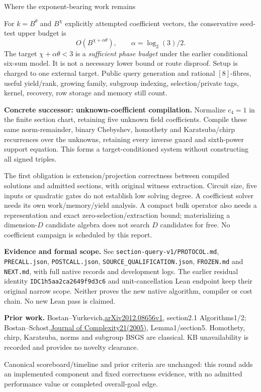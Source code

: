 \documentclass[10pt]{article}
\begin{document}
\newpage
{\large Where the exponent-bearing work remains}\par
For $k=B^\theta$ and $B^\chi$ explicitly attempted coefficient vectors,
the conservative seed-test upper budget is
\[
O(B^{\chi+\alpha\theta}),\qquad\alpha=\log_2(3)/2.
\]
The target $\chi+\alpha\theta<3$ is a \emph{sufficient phase budget} under the
earlier conditional six-sum model. It is not a necessary lower bound or route
disproof. Setup is charged to one external target. Public query generation and
rational $[8]$-fibres, useful yield/rank, growing family, subgroup indexing,
selection/private tags, kernel, recovery, row storage and memory still count.

\textbf{Concrete successor: unknown-coefficient compilation.}
Normalize $c_4=1$ in the finite section chart, retaining five unknown field
coefficients. Compile these same norm-remainder, binary Chebyshev,
homothety and Karatsuba/chirp recurrences over the unknowns, retaining every
inverse guard and sixth-power support equation. This forms a target-conditioned
system without constructing all signed triples.

The first obligation is extension/projection correctness between compiled
solutions and admitted sections, with original witness extraction. Circuit
size, five inputs or quadratic gates do not establish low solving degree.
A coefficient solver needs its own work/memory/yield analysis. A compact bulk
operator also needs a representation and exact zero-selection/extraction bound;
materializing a dimension-$D$ candidate algebra does not search $D$ candidates
for free. No coefficient campaign is scheduled by this report.

\textbf{Evidence and formal scope.}
See \texttt{section-query-v1/PROTOCOL.md}, \texttt{PRECALL.json},
\texttt{POSTCALL.json}, \texttt{SOURCE\_QUALIFICATION.json}, \texttt{FROZEN.md}
and \texttt{NEXT.md}, with full native records and development logs.
The earlier residual identity \texttt{IDC1h5aa2ca2649f9d3c6} and unit-cancellation
Lean endpoint keep their original narrow scope. Neither proves the new native
algorithm, compiler or cost chain. No new Lean pass is claimed.

\textbf{Prior work.}
Bostan--Yurkevich,\href{https://arxiv.org/pdf/2012.08656v1}{arXiv2012.08656v1},
section2.1 Algorithms1/2; Bostan--Schost,\href{https://mathexp.eu/bostan/publications/BoSc05.pdf}{Journal of Complexity21(2005)},
Lemma1/section5. Homothety, chirp, Karatsuba, norms and subgroup BSGS are classical.
KB unavailability is recorded and provides no novelty clearance.

Canonical scoreboard/timeline and prior criteria are unchanged: this round adds
an implemented component and fixed correctness evidence, with no admitted
performance value or completed overall-goal edge.
\end{document}

